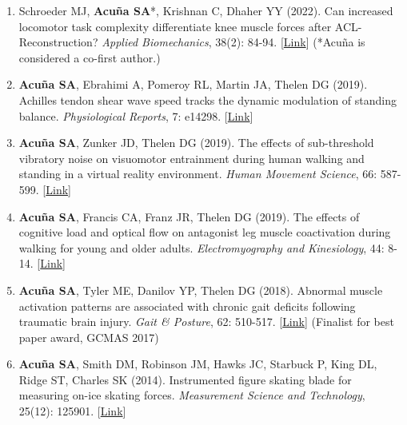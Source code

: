 \documentclass[letterpaper, 10pt]{article}
\begin{document}
\begin{enumerate}
    \item Schroeder MJ, \textbf{Acuña SA}*, Krishnan C, Dhaher YY (2022). Can increased locomotor task complexity differentiate knee muscle forces after ACL-Reconstruction? \textit{Applied Biomechanics}, 38(2): 84-94. [\href{https://journals.humankinetics.com/view/journals/jab/38/2/article-p84.xml}{Link}] (*Acuña is considered a co-ﬁrst author.)
    \item \textbf{Acuña SA}, Ebrahimi A, Pomeroy RL, Martin JA, Thelen DG (2019). Achilles tendon shear wave speed tracks the dynamic modulation of standing balance. \textit{Physiological Reports}, 7: e14298. [\href{https://physoc.onlinelibrary.wiley.com/doi/full/10.14814/phy2.14298}{Link}]
    \item \textbf{Acuña SA}, Zunker JD, Thelen DG (2019). The effects of sub-threshold vibratory noise on visuomotor entrainment during human walking and standing in a virtual reality environment. \textit{Human Movement Science}, 66: 587-599. [\href{https://www.sciencedirect.com/science/article/abs/pii/S0167945719300582}{Link}]
    \item \textbf{Acuña SA}, Francis CA, Franz JR, Thelen DG (2019). The effects of cognitive load and optical ﬂow on antagonist leg muscle coactivation during walking for young and older adults. \textit{Electromyography and Kinesiology}, 44: 8-14. [\href{https://www.sciencedirect.com/science/article/abs/pii/S1050641118303122}{Link}]
    \item \textbf{Acuña SA}, Tyler ME, Danilov YP, Thelen DG (2018). Abnormal muscle activation patterns are associated with chronic gait deﬁcits following traumatic brain injury. \textit{Gait \& Posture}, 62: 510-517. [\href{https://www.sciencedirect.com/science/article/abs/pii/S096663621830359X}{Link}] (Finalist for best paper award, GCMAS 2017)
    \item \textbf{Acuña SA}, Smith DM, Robinson JM, Hawks JC, Starbuck P, King DL, Ridge ST, Charles SK (2014). Instrumented ﬁgure skating blade for measuring on-ice skating forces. \textit{Measurement Science and Technology}, 25(12): 125901. [\href{https://iopscience.iop.org/article/10.1088/0957-0233/25/12/125901}{Link}]
\end{enumerate}
\end{document}
